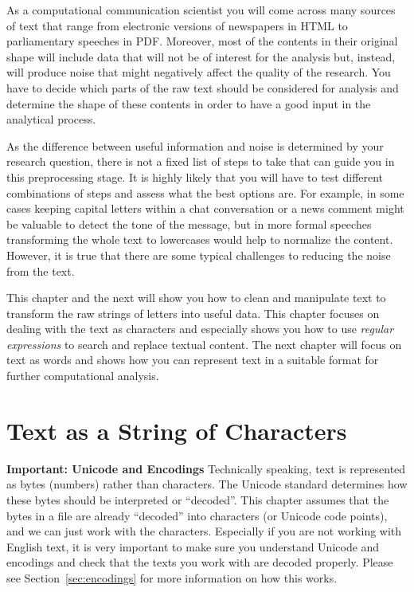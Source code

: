 As a computational communication scientist you will come across many sources of text that range from electronic versions of newspapers in HTML to parliamentary speeches in PDF. Moreover, most of the contents in their original shape will include data that will not be of interest for the analysis but, instead,  will produce noise that might negatively affect the quality of the research. You have to decide which parts of the raw text should be considered for analysis and determine the shape of these contents in order to have a good input in the analytical process.

As the difference between useful information and noise is determined by your research question,
there is not a fixed list of steps to take that can guide you in this preprocessing stage.
It is highly likely that you will have to test different combinations of steps and assess what  the best options are.
For example, in some cases keeping capital letters within a chat conversation or a news comment might be valuable to detect the tone of the message, but in more formal speeches transforming the whole text to lowercases would help to normalize the content.
However, it is true that there are some typical challenges to reducing the noise from the text.

This chapter and the next will show you how to clean and manipulate text to transform the raw strings of letters into useful data.
This chapter focuses on dealing with the text as characters and especially shows you how to use \emph{regular expressions} to search and replace textual content.
The next chapter will focus on text as words and shows how you can represent text in a suitable format for further computational analysis.

\section{Text as a String of Characters} \label{sec:unicode}

\begin{feature}
  \textbf{Important: Unicode and Encodings}
  Technically speaking, text is represented as bytes (numbers) rather than characters.
  The  Unicode standard determines how these bytes should be interpreted or ``decoded''.
  This chapter assumes that the bytes in a file are already ``decoded'' into characters (or Unicode code points),
  and we can just work with the characters.
  Especially if you are not working with English text, it is very important to make sure you understand Unicode and encodings
  and check that the texts you work with are decoded properly.
  Please see Section~\ref{sec:encodings} for more information on how this works.
\end{feature}

